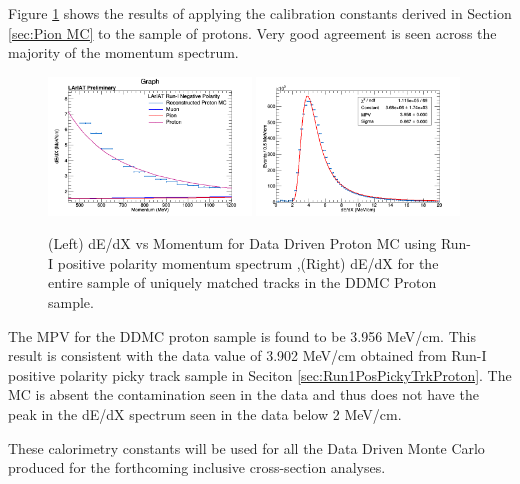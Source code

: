 Figure \ref{fig:DDMCProtonResults} shows the results of applying the calibration constants derived in Section \ref{sec:Pion MC} to the sample of protons. Very good agreement is seen across the majority of the momentum spectrum.

\begin{figure}[htb]
\centering
\includegraphics[width=0.48\textwidth]{images/dEdXvsMomentumProtonMCVeryFineBin.png}
\includegraphics[width=0.48\textwidth]{images/dEdXDDMCProtonRunI.png}
\caption{(Left) dE/dX vs Momentum for Data Driven Proton MC using Run-I positive polarity momentum spectrum ,(Right) dE/dX for the entire sample of uniquely matched tracks in the DDMC Proton sample.}
\label{fig:DDMCProtonResults}
\end{figure}


The MPV for the DDMC proton sample is found to be 3.956 MeV/cm. This result is consistent with the data value of 3.902 MeV/cm obtained from Run-I positive polarity picky track sample in Seciton \ref{sec:Run1PosPickyTrkProton}. The MC is absent the contamination seen in the data and thus does not have the peak in the dE/dX spectrum seen in the data below 2 MeV/cm.


These calorimetry constants will be used for all the Data Driven Monte Carlo produced for the forthcoming inclusive cross-section analyses.
\newpage




